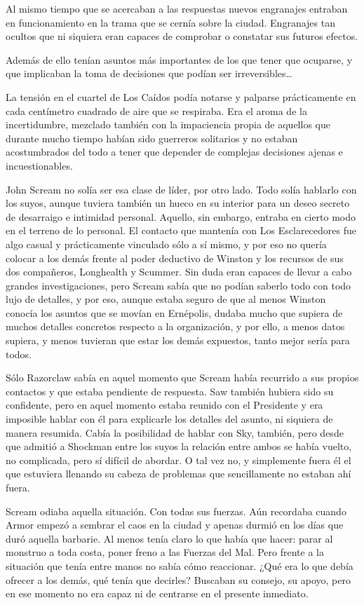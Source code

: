 Al mismo tiempo que se acercaban a las respuestas nuevos engranajes entraban en funcionamiento en la trama que se cernía sobre la ciudad. Engranajes tan ocultos que ni siquiera eran capaces de comprobar o constatar sus futuros efectos.

Además de ello tenían asuntos más importantes de los que tener que ocuparse, y que implicaban la toma de decisiones que podían ser irreversibles…

\fancyparbreak
La tensión en el cuartel de Los Caídos podía notarse y palparse prácticamente en cada centímetro cuadrado de aire que se respiraba. Era el aroma de la incertidumbre, mezclado también con la impaciencia propia de aquellos que durante mucho tiempo habían sido guerreros solitarios y no estaban acostumbrados del todo a tener que depender de complejas decisiones ajenas e incuestionables.

John Scream no solía ser esa clase de líder, por otro lado. Todo solía hablarlo con los suyos, aunque tuviera también un hueco en su interior para un deseo secreto de desarraigo e intimidad personal. Aquello, sin embargo, entraba en cierto modo en el terreno de lo personal. El contacto que mantenía con Los Esclarecedores fue algo casual y prácticamente vinculado sólo a sí mismo, y por eso no quería colocar a los demás frente al poder deductivo de Winston y los recursos de sus dos compañeros, Longhealth y Scummer. Sin duda eran capaces de llevar a cabo grandes investigaciones, pero Scream sabía que no podían saberlo todo con todo lujo de detalles, y por eso, aunque estaba seguro de que al menos Winston conocía los asuntos que se movían en Ernépolis, dudaba mucho que supiera de muchos detalles concretos respecto a la organización, y por ello, a menos datos supiera, y menos tuvieran que estar los demás expuestos, tanto mejor sería para todos.

Sólo Razorclaw sabía en aquel momento que Scream había recurrido a sus propios contactos y que estaba pendiente de respuesta. Saw también hubiera sido su confidente, pero en aquel momento estaba reunido con el Presidente y era imposible hablar con él para explicarle los detalles del asunto, ni siquiera de manera resumida. Cabía la posibilidad de hablar con Sky, también, pero desde que admitió a Shockman entre los suyos la relación entre ambos se había vuelto, no complicada, pero sí difícil de abordar. O tal vez no, y simplemente fuera él el que estuviera llenando su cabeza de problemas que sencillamente no estaban ahí fuera.

Scream odiaba aquella situación. Con todas sus fuerzas. Aún recordaba cuando Armor empezó a sembrar el caos en la ciudad y apenas durmió en los días que duró aquella barbarie. Al menos tenía claro lo que había que hacer: parar al monstruo a toda costa, poner freno a las Fuerzas del Mal. Pero frente a la situación que tenía entre manos no sabía cómo reaccionar. ¿Qué era lo que debía ofrecer a los demás, qué tenía que decirles? Buscaban su consejo, su apoyo, pero en ese momento no era capaz ni de centrarse en el presente inmediato.

